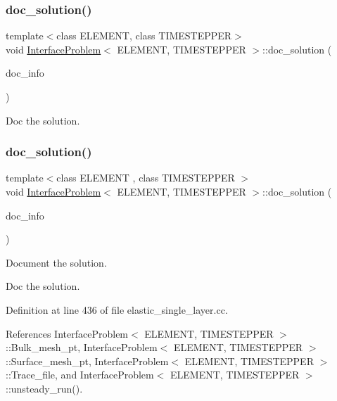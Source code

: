 \subsubsection{\texorpdfstring{doc\+\_\+solution()}{doc\_solution()}\hspace{0.1cm}{\footnotesize\ttfamily [1/2]}}
{\footnotesize\ttfamily template$<$class E\+L\+E\+M\+E\+NT, class T\+I\+M\+E\+S\+T\+E\+P\+P\+ER$>$ \\
void \hyperlink{classInterfaceProblem}{Interface\+Problem}$<$ E\+L\+E\+M\+E\+NT, T\+I\+M\+E\+S\+T\+E\+P\+P\+ER $>$\+::doc\+\_\+solution (\begin{DoxyParamCaption}\item[{Doc\+Info \&}]{doc\+\_\+info }\end{DoxyParamCaption})}



Doc the solution. 

\mbox{\label{classInterfaceProblem_a49714e35e94f7d2af0b6ddd22b851f52}} 
\subsubsection{\texorpdfstring{doc\+\_\+solution()}{doc\_solution()}\hspace{0.1cm}{\footnotesize\ttfamily [2/2]}}
{\footnotesize\ttfamily template$<$class E\+L\+E\+M\+E\+NT , class T\+I\+M\+E\+S\+T\+E\+P\+P\+ER $>$ \\
void \hyperlink{classInterfaceProblem}{Interface\+Problem}$<$ E\+L\+E\+M\+E\+NT, T\+I\+M\+E\+S\+T\+E\+P\+P\+ER $>$\+::doc\+\_\+solution (\begin{DoxyParamCaption}\item[{Doc\+Info \&}]{doc\+\_\+info }\end{DoxyParamCaption})}



Document the solution. 

Doc the solution. 

Definition at line 436 of file elastic\+\_\+single\+\_\+layer.\+cc.



References Interface\+Problem$<$ E\+L\+E\+M\+E\+N\+T, T\+I\+M\+E\+S\+T\+E\+P\+P\+E\+R $>$\+::\+Bulk\+\_\+mesh\+\_\+pt, Interface\+Problem$<$ E\+L\+E\+M\+E\+N\+T, T\+I\+M\+E\+S\+T\+E\+P\+P\+E\+R $>$\+::\+Surface\+\_\+mesh\+\_\+pt, Interface\+Problem$<$ E\+L\+E\+M\+E\+N\+T, T\+I\+M\+E\+S\+T\+E\+P\+P\+E\+R $>$\+::\+Trace\+\_\+file, and Interface\+Problem$<$ E\+L\+E\+M\+E\+N\+T, T\+I\+M\+E\+S\+T\+E\+P\+P\+E\+R $>$\+::unsteady\+\_\+run().



